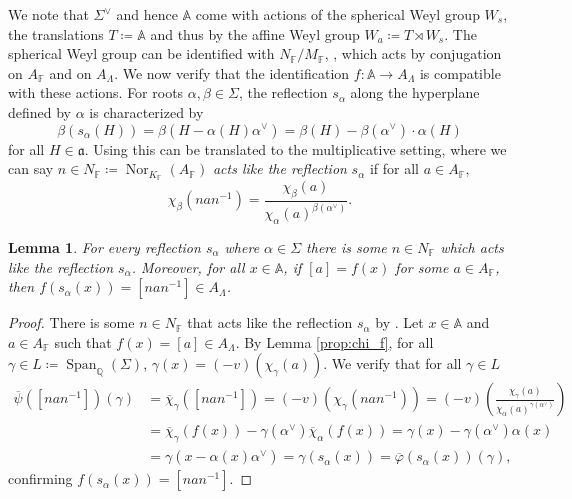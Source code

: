 \documentclass[12pt]{amsart}
\newcommand{\F}{\mathbb{F} }
\newcommand{\Q}{\mathbb{Q} }
\newcommand{\fraka}{\mathfrak{a}}
\newcommand{\A}{\mathbb{A}}
\numberwithin{equation}{section}
\newtheorem{lemma}[theorem]{Lemma}
\theoremstyle{remark} %
\begin{document}
We note that $\Sigma^\vee$ and hence $\A$ come with actions of the spherical Weyl group $W_s$, the translations $T\coloneqq \A$ and thus by the affine Weyl group $W_a \coloneqq  T \rtimes W_s$. The spherical Weyl group can be identified with $N_\F/M_\F$, \cite[Proposition \ref{I-prop:weylgroups}]{AppAGRCF}, which acts by conjugation on $A_\F$ and on $A_\Lambda$. We now verify that the identification $f \colon \A \to A_\Lambda$ is compatible with these actions. For roots $\alpha,\beta \in \Sigma$, the reflection $s_\alpha$ along the hyperplane defined by $\alpha$ is characterized by 
$$
\beta(s_\alpha(H)) =  \beta\left(H - \alpha(H)\alpha^\vee\right) = \beta(H)- \beta(\alpha^\vee) \cdot \alpha(H)
$$
for all $H\in \fraka$. Using \cite[Lemma \ref{I-lem:char}]{AppAGRCF} this can be translated to the multiplicative setting, where we can say $n\in N_\F \coloneqq \operatorname{Nor}_{K_\F}(A_\F)$ \emph{acts like the reflection} $s_\alpha$ if for all $a \in A_\F$,
$$
\chi_\beta (nan^{-1}) = \frac{\chi_\beta(a)}{\chi_\alpha(a)^{\beta(\alpha^\vee)}}.
$$
\begin{lemma}\label{lem:actionWs}
  For every reflection $s_\alpha$ where $\alpha \in \Sigma$ there is some $n \in N_\F$ which acts like the reflection $s_\alpha$. Moreover, for all $x\in \A$, if $[a]=f(x)$ for some $a\in A_\F$, then $f(s_\alpha(x)) = [nan^{-1}] \in A_\Lambda$.	
\end{lemma}
\begin{proof}
	There is some $n\in N_\F$ that acts like the reflection $s_\alpha$ by \cite[Proposition \ref{I-prop:weylgroups}]{AppAGRCF}.
	Let $x\in \A$ and $a\in A_\F$ such that $f(x) = [a] \in A_\Lambda$. By Lemma \ref{prop:chi_f}, for all $\gamma \in L \coloneqq \operatorname{Span}_\Q(\Sigma)$, $\gamma(x)= (-v)(\chi_\gamma(a))$. We verify that for all $\gamma\in L$
	\begin{align*}
		\overline{\psi}([nan^{-1}])(\gamma) &= \overline{\chi}_\gamma([nan^{-1}]) 
		= (-v)(\chi_\gamma(nan^{-1}))
		= (-v)\left( \frac{\chi_\gamma(a)}{\chi_\alpha(a)^{\gamma(\alpha^\vee)}} \right) \\
		&= \overline{\chi}_\gamma(f(x)) - \gamma(\alpha^\vee) \overline{\chi}_\alpha(f(x))
		= \gamma(x) - \gamma(\alpha^\vee) \alpha(x) \\
		&= \gamma( x-\alpha(x) \alpha^\vee )
		= \gamma(s_\alpha(x))
		= \overline{\varphi}(s_\alpha(x))(\gamma), 
	\end{align*}
confirming $f(s_\alpha(x)) = [nan^{-1}]$.
\end{proof}
\end{document}
